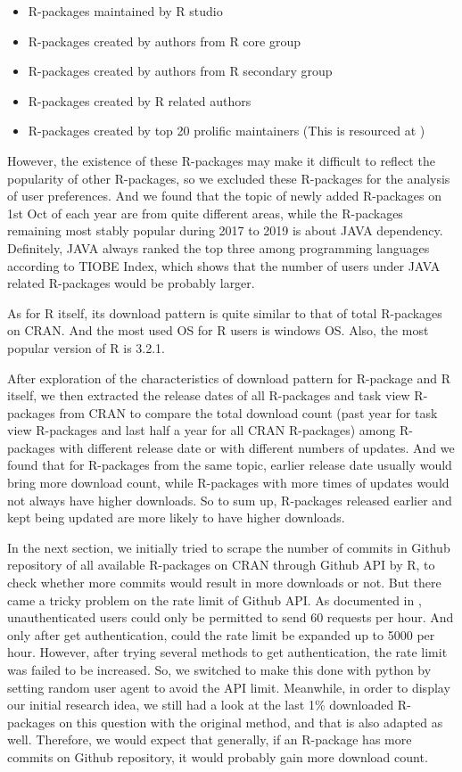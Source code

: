 \documentclass[
]{book}
\providecommand{\tightlist}{%
  \setlength{\itemsep}{0pt}\setlength{\parskip}{0pt}}
\begin{document}
\begin{itemize}
\tightlist
\item
  R-packages maintained by R studio
\item
  R-packages created by authors from R core group
\item
  R-packages created by authors from R secondary group
\item
  R-packages created by R related authors
\item
  R-packages created by top 20 prolific maintainers (This is resourced at \textcite{revolutions})
\end{itemize}

However, the existence of these R-packages may make it difficult to reflect the popularity of other R-packages, so we excluded these R-packages for the analysis of user preferences. And we found that the topic of newly added R-packages on 1st Oct of each year are from quite different areas, while the R-packages remaining most stably popular during 2017 to 2019 is about JAVA dependency. Definitely, JAVA always ranked the top three among programming languages according to TIOBE Index\autocite{tiobe}, which shows that the number of users under JAVA related R-packages would be probably larger.

As for R itself, its download pattern is quite similar to that of total R-packages on CRAN. And the most used OS for R users is windows OS. Also, the most popular version of R is 3.2.1.

After exploration of the characteristics of download pattern for R-package and R itself, we then extracted the release dates of all R-packages and task view R-packages from CRAN to compare the total download count (past year for task view R-packages and last half a year for all CRAN R-packages) among R-packages with different release date or with different numbers of updates. And we found that for R-packages from the same topic, earlier release date usually would bring more download count, while R-packages with more times of updates would not always have higher downloads. So to sum up, R-packages released earlier and kept being updated are more likely to have higher downloads.

In the next section, we initially tried to scrape the number of commits in Github repository of all available R-packages on CRAN through Github API by R, to check whether more commits would result in more downloads or not. But there came a tricky problem on the rate limit of Github API. As documented in \textcite{githubapi}, unauthenticated users could only be permitted to send 60 requests per hour. And only after get authentication, could the rate limit be expanded up to 5000 per hour. However, after trying several methods to get authentication, the rate limit was failed to be increased. So, we switched to make this done with python by setting random user agent to avoid the API limit. Meanwhile, in order to display our initial research idea, we still had a look at the last 1\% downloaded R-packages on this question with the original method, and that is also adapted as well. Therefore, we would expect that generally, if an R-package has more commits on Github repository, it would probably gain more download count.
\end{document}
